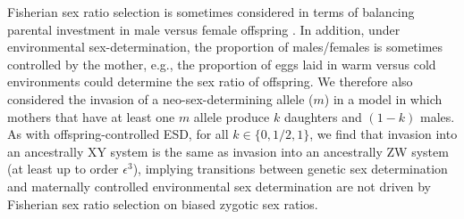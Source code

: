 \documentclass[12pt]{article}
\begin{document}


Fisherian sex ratio selection is sometimes considered in terms of balancing parental investment in male versus female offspring \citep{Charnov:1982wg}.
In addition, under environmental sex-determination, the proportion of males/females is sometimes controlled by the mother, e.g., the proportion of eggs laid in warm versus cold environments could determine the sex ratio of offspring. 
We therefore also considered the invasion of a neo-sex-determining allele ($m$) in a model in which mothers that have at least one $m$ allele produce $k$ daughters and $(1-k)$ males. 
As with offspring-controlled ESD, for all $k\in\{0,1/2,1\}$, we find that invasion into an ancestrally XY system is the same as invasion into an ancestrally ZW system (at least up to order $\epsilon^3$), implying transitions between genetic sex determination and maternally controlled environmental sex determination are not driven by Fisherian sex ratio selection on biased zygotic sex ratios.
\end{document}
